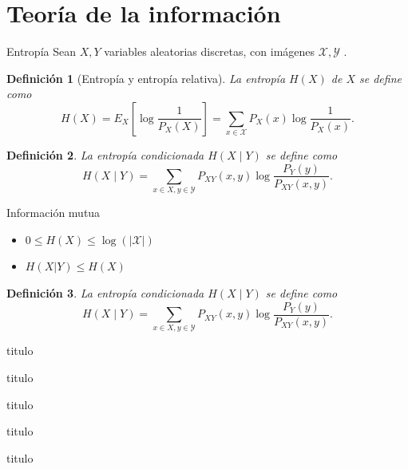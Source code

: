 \documentclass[aspectratio=169]{beamer}
\newcommand{\X}{\mathcal{X}}
\newtheorem{defi}{Definición}
\begin{document}
  
  \section{Teoría de la información}

  \begin{frame}{Entropía}
    Sean \(X,Y\) variables aleatorias discretas, con imágenes \(\X, \mathcal Y\) .


    \begin{defi}[Entropía y entropía relativa]
    
    
      La entropía \(H(X)\) de \(X\) se define como
      \[
        H(X) = E_X\left[\log\frac{1}{P_X(X)}\right] =  \sum_{x \in \X} P_X(x) \log\frac{1}{P_X(x)}.
      \]
    \end{defi}
    \begin{defi}
      La entropía  condicionada \(H(X\mid Y)\) se define como
      \[
        H(X\mid Y) = \sum_{x \in X,y \in \mathcal Y}P_{XY}(x,y)\log\frac{P_Y(y)}{P_{XY}(x,y)}.
      \]
      
      
    \end{defi}

  \end{frame}


  \begin{frame}{Información mutua}
    
    \begin{itemize}
      \item $0 \leq H(X) \leq \log(|\X|)$
      \item $ H(X|Y) \leq H(X) $
     \end{itemize}

     
    \begin{defi}
      La entropía  condicionada \(H(X\mid Y)\) se define como
      \[
        H(X\mid Y) = \sum_{x \in X,y \in \mathcal Y}P_{XY}(x,y)\log\frac{P_Y(y)}{P_{XY}(x,y)}.
      \]
      
      
    \end{defi}
 
  \end{frame}
  \begin{frame}{titulo}
  
  \end{frame}
  \begin{frame}{titulo}
  
  \end{frame}
  \begin{frame}{titulo}
  
  \end{frame}
  \begin{frame}{titulo}
  
  \end{frame}
  \begin{frame}{titulo}
  
  \end{frame}
\end{document}
